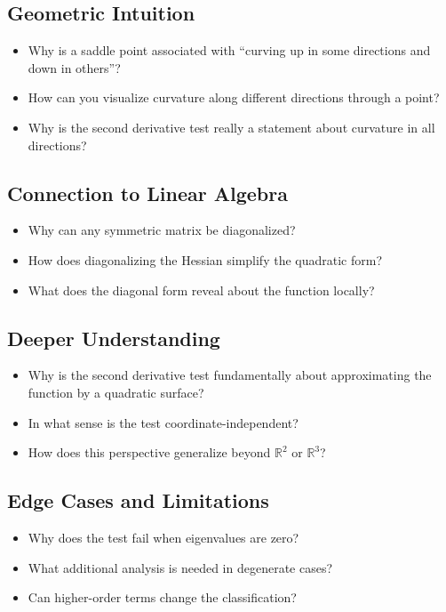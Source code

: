 \subsection{Geometric Intuition}

\begin{itemize}
  \item Why is a saddle point associated with ``curving up in some directions and down in others''?
  \item How can you visualize curvature along different directions through a point?
  \item Why is the second derivative test really a statement about curvature in all directions?
\end{itemize}

\subsection{Connection to Linear Algebra}

\begin{itemize}
  \item Why can any symmetric matrix be diagonalized?
  \item How does diagonalizing the Hessian simplify the quadratic form?
  \item What does the diagonal form reveal about the function locally?
\end{itemize}

\subsection{Deeper Understanding}

\begin{itemize}
  \item Why is the second derivative test fundamentally about approximating the function by a quadratic surface?
  \item In what sense is the test coordinate-independent?
  \item How does this perspective generalize beyond \(\mathbb{R}^{2}\) or \(\mathbb{R}^{3}\)?
\end{itemize}

\subsection{Edge Cases and Limitations}

\begin{itemize}
  \item Why does the test fail when eigenvalues are zero?
  \item What additional analysis is needed in degenerate cases?
  \item Can higher-order terms change the classification?
\end{itemize}
